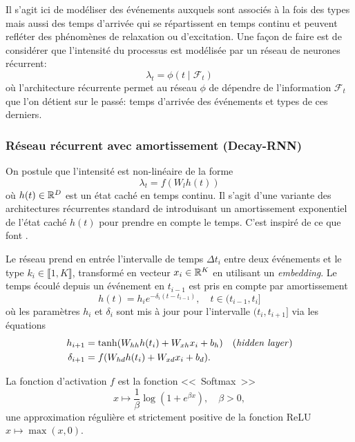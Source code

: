 \documentclass[../main.tex]{subfiles}
\begin{document}
Il s'agit ici de modéliser des événements auxquels sont associés à la fois des types mais aussi des temps d'arrivée qui se répartissent en temps continu et peuvent refléter des phénomènes de relaxation ou d'excitation. Une façon de faire est de considérer que l'intensité du processus est modélisée par un réseau de neurones récurrent:
\[
	\lambda_t = \phi(t\mid \mathcal{F}_t)
\]
où l'architecture récurrente permet au réseau $\phi$ de dépendre de l'information $\mathcal{F}_t$ que l'on détient sur le passé: temps d'arrivée des événements et types de ces derniers.



\subsubsection{Réseau récurrent avec amortissement (Decay-RNN)}\label{sssec:decayRNN}

On postule que l'intensité est non-linéaire de la forme
\begin{equation}\label{eq:decayRNNintensity}
\lambda_t = f(W_l h(t))
\end{equation}
où $h(t)\in\mathbb{R}^D$ est un état caché en temps continu. Il s'agit d'une variante des architectures récurrentes standard de \citeauthor{elman1990srnn} introduisant un amortissement exponentiel de l'état caché $h(t)$ pour prendre en compte le temps. C'est inspiré de ce que font \citeauthor{meiEisnerNeuralHawkes} \cite{meiEisnerNeuralHawkes}.

Le réseau prend en entrée l'intervalle de temps $\Delta t_i$ entre deux événements et le type $k_i\in\llbracket 1,K\rrbracket$, transformé en vecteur $x_i\in\mathbb{R}^K$ en utilisant un \textit{embedding}.
Le temps écoulé depuis un événement en $t_{i-1}$ est pris en compte par amortissement
\begin{equation}
h(t) = h_{i}e^{-\delta_i(t-t_{i-1})},\quad t\in(t_{i-1},t_i]
\end{equation}
où les paramètres $h_i$ et $\delta_i$ sont mis à jour pour l'intervalle $(t_i,t_{i+1}]$ via les équations
\begin{subequations}
\begin{align}
	h_{i+1} &= \tanh(W_{hh}h(t_i) + W_{xh}x_i + b_{h})\quad\text{(\textit{hidden layer})} \\
	\delta_{i+1} &= f(W_{hd}h(t_i) + W_{xd}x_i + b_d).
\end{align}
\end{subequations}

La fonction d'activation $f$ est la fonction <<~Softmax~>>
\[
	x\mapsto \frac{1}{\beta}\log(1+e^{\beta x}),\quad\beta > 0,
\]
une approximation régulière et strictement positive de la fonction ReLU $x\mapsto \max(x,0)$.
\end{document}
